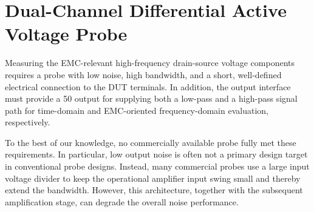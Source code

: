 
\chapter{Dual-Channel Differential Active Voltage Probe}
\label{ch:voltage}

Measuring the EMC-relevant high-frequency drain-source voltage components requires a probe with low noise, high bandwidth, and a short, well-defined electrical connection to the DUT terminals.
In addition, the output interface must provide a \SI{50}{\Omega} output for supplying both a low-pass and a high-pass signal path for time-domain and EMC-oriented frequency-domain evaluation, respectively.

To the best of our knowledge, no commercially available probe fully met these requirements. 
In particular, low output noise is often not a primary design target in conventional probe designs. 
Instead, many commercial probes use a large input voltage divider to keep the operational amplifier input swing small and thereby extend the bandwidth. 
However, this architecture, together with the subsequent amplification stage, can degrade the overall noise performance.











